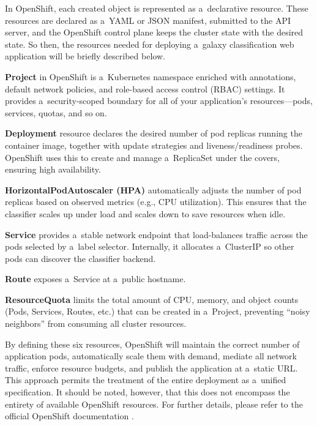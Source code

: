 \medskip

In OpenShift, each created object is represented as a~declarative resource. These resources are declared as a~YAML or JSON manifest, submitted to the API server, and the OpenShift control plane keeps the cluster state with the desired state. So then, the resources needed for deploying a~galaxy classification web application will be briefly described below.

\medskip

\textbf{Project} in OpenShift is a~Kubernetes namespace enriched with annotations, default network policies, and role-based access control (RBAC) settings. It provides a~security-scoped boundary for all of your application’s resources—pods, services, quotas, and so on.

\medskip

\textbf{Deployment} resource declares the desired number of pod replicas running the container image, together with update strategies and liveness/readiness probes. OpenShift uses this to create and manage a~ReplicaSet under the covers, ensuring high availability.

\medskip

\textbf{HorizontalPodAutoscaler (HPA)} automatically adjusts the number of pod replicas based on observed metrics (e.g., CPU utilization). This ensures that the classifier scales up under load and scales down to save resources when idle.

\medskip

\textbf{Service} provides a~stable network endpoint that load-balances traffic across the pods selected by a~label selector. Internally, it allocates a~ClusterIP so other pods can discover the classifier backend.

\medskip

\textbf{Route} exposes a~Service at a~public hostname.

\medskip

\textbf{ResourceQuota} limits the total amount of CPU, memory, and object counts (Pods, Services, Routes, etc.) that can be created in a~Project, preventing “noisy neighbors” from consuming all cluster resources.

\medskip

By defining these six resources, OpenShift will maintain the correct number of application pods, automatically scale them with demand, mediate all network traffic, enforce resource budgets, and publish the application at a~static URL. This approach permits the treatment of the entire deployment as a~unified specification. It should be noted, however, that this does not encompass the entirety of available OpenShift resources. For further details, please refer to the official OpenShift documentation \cite{RedHat2023}.

